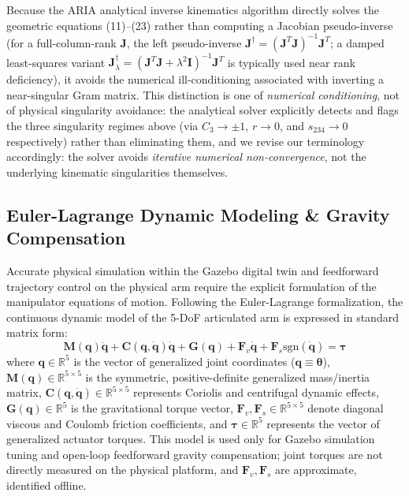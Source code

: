 \documentclass[journal]{IEEEtran}
\begin{document}
Because the ARIA analytical inverse kinematics algorithm directly solves the geometric equations (11)–(23) rather than computing a Jacobian pseudo-inverse (for a full-column-rank $\mathbf{J}$, the left pseudo-inverse $\mathbf{J}^{\dagger} = (\mathbf{J}^T\mathbf{J})^{-1}\mathbf{J}^T$; a damped least-squares variant $\mathbf{J}^{\dagger}_{\lambda} = (\mathbf{J}^T\mathbf{J} + \lambda^2\mathbf{I})^{-1}\mathbf{J}^T$ is typically used near rank deficiency), it avoids the numerical ill-conditioning associated with inverting a near-singular Gram matrix. This distinction is one of \emph{numerical conditioning}, not of physical singularity avoidance: the analytical solver explicitly detects and flags the three singularity regimes above (via $C_3\to\pm1$, $r\to0$, and $s_{234}\to0$ respectively) rather than eliminating them, and we revise our terminology accordingly: the solver avoids \emph{iterative numerical non-convergence}, not the underlying kinematic singularities themselves.

\subsection{Euler-Lagrange Dynamic Modeling \& Gravity Compensation}
Accurate physical simulation within the Gazebo digital twin and feedforward trajectory control on the physical arm require the explicit formulation of the manipulator equations of motion. Following the Euler-Lagrange formalization, the continuous dynamic model of the 5-DoF articulated arm is expressed in standard matrix form:
\begin{equation}
\mathbf{M}(\mathbf{q})\ddot{\mathbf{q}} + \mathbf{C}(\mathbf{q}, \dot{\mathbf{q}})\dot{\mathbf{q}} + \mathbf{G}(\mathbf{q}) + \mathbf{F}_v \dot{\mathbf{q}} + \mathbf{F}_s \text{sgn}(\dot{\mathbf{q}}) = \boldsymbol{\tau}
\end{equation}
where $\mathbf{q} \in \mathbb{R}^5$ is the vector of generalized joint coordinates ($\mathbf{q} \equiv \boldsymbol{\theta}$), $\mathbf{M}(\mathbf{q}) \in \mathbb{R}^{5\times5}$ is the symmetric, positive-definite generalized mass/inertia matrix, $\mathbf{C}(\mathbf{q}, \dot{\mathbf{q}}) \in \mathbb{R}^{5\times5}$ represents Coriolis and centrifugal dynamic effects, $\mathbf{G}(\mathbf{q}) \in \mathbb{R}^5$ is the gravitational torque vector, $\mathbf{F}_v, \mathbf{F}_s \in \mathbb{R}^{5\times5}$ denote diagonal viscous and Coulomb friction coefficients, and $\boldsymbol{\tau} \in \mathbb{R}^5$ represents the vector of generalized actuator torques. This model is used only for Gazebo simulation tuning and open-loop feedforward gravity compensation; joint torques are not directly measured on the physical platform, and $\mathbf{F}_v,\mathbf{F}_s$ are approximate, identified offline.
\end{document}
